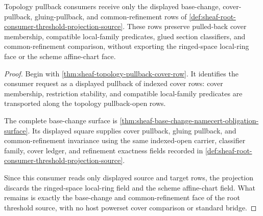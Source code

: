 \begin{theorem}
\label{thm:sheaf-root-consumer-pullback-projection}
Topology pullback consumers receive only the displayed base-change, cover-pullback, gluing-pullback, and common-refinement rows of \autoref{def:sheaf-root-consumer-threshold-projection-source}. These rows preserve pulled-back cover membership, compatible local-family predicates, glued section classifiers, and common-refinement comparison, without exporting the ringed-space local-ring face or the scheme affine-chart face.
\end{theorem}
\begin{proof}
Begin with \autoref{thm:sheaf-topology-pullback-cover-row}. It identifies the consumer request as a displayed pullback of indexed cover rows: cover membership, restriction stability, and compatible local-family predicates are transported along the topology pullback-open rows.

The complete base-change surface is \autoref{thm:sheaf-base-change-namecert-obligation-surface}. Its displayed square supplies cover pullback, gluing pullback, and common-refinement invariance using the same indexed-open carrier, classifier family, cover ledger, and refinement exactness fields recorded in \autoref{def:sheaf-root-consumer-threshold-projection-source}.

Since this consumer reads only displayed source and target rows, the projection discards the ringed-space local-ring field and the scheme affine-chart field. What remains is exactly the base-change and common-refinement face of the root threshold source, with no host powerset cover comparison or standard bridge.
\end{proof}
